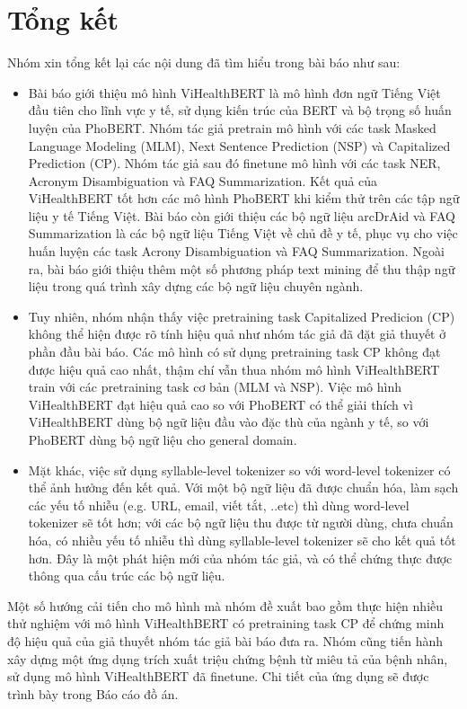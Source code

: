 \section{Tổng kết}
Nhóm xin tổng kết lại các nội dung đã tìm hiểu trong bài báo như sau:
\begin{itemize}
\item Bài báo giới thiệu mô hình ViHealthBERT là mô hình đơn ngữ Tiếng Việt đầu tiên cho lĩnh vực y tế, sử dụng kiến trúc của BERT và bộ trọng số huấn luyện của PhoBERT. Nhóm tác giả pretrain mô hình với các task Masked Language Modeling (MLM), Next Sentence Prediction (NSP) và Capitalized Prediction (CP). Nhóm tác giả sau đó finetune mô hình với các task NER, Acronym Disambiguation và FAQ Summarization. Kết quả của ViHealthBERT tốt hơn các mô hình PhoBERT khi kiểm thử trên các tập ngữ liệu y tế Tiếng Việt. Bài báo còn giới thiệu các bộ ngữ liệu arcDrAid và FAQ Summarization là các bộ ngữ liệu Tiếng Việt về chủ đề y tế, phục vụ cho việc huấn luyện các task Acrony Disambiguation và FAQ Summarization. Ngoài ra, bài báo giới thiệu thêm một số phương pháp text mining để thu thập ngữ liệu trong quá trình xây dựng các bộ ngữ liệu chuyên ngành.

\item Tuy nhiên, nhóm nhận thấy việc pretraining task Capitalized Predicion (CP) không thể hiện được rõ tính hiệu quả như nhóm tác giả đã đặt giả thuyết ở phần đầu bài báo. Các mô hình có sử dụng pretraining task CP không đạt được hiệu quả cao nhất, thậm chí vẫn thua nhóm mô hình ViHealthBERT train với các pretraining task cơ bản (MLM và NSP). Việc mô hình ViHealthBERT đạt hiệu quả cao so với PhoBERT có thể giải thích vì ViHealthBERT dùng bộ ngữ liệu đầu vào đặc thù của ngành y tế, so với PhoBERT dùng bộ ngữ liệu cho general domain.

\item  Mặt khác, việc sử dụng syllable-level tokenizer so với word-level tokenizer có thể ảnh hưởng đến kết quả. Với một bộ ngữ liệu đã được chuẩn hóa, làm sạch các yếu tố nhiễu (e.g. URL, email, viết tắt, ..etc) thì dùng word-level tokenizer sẽ tốt hơn; với các bộ ngữ liệu thu được từ người dùng, chưa chuẩn hóa, có nhiều yếu tố nhiễu thì dùng syllable-level tokenizer sẽ cho kết quả tốt hơn. Đây là một phát hiện mới của nhóm tác giả, và có thể chứng thực được thông qua cấu trúc các bộ ngữ liệu.
\end{itemize}
Một số hướng cải tiến cho mô hình mà nhóm đề xuất bao gồm thực hiện nhiều thử nghiệm với mô hình ViHealthBERT có pretraining task CP để chứng minh độ hiệu quả của giả thuyết nhóm tác giả bài báo đưa ra. Nhóm cũng tiến hành xây dựng một ứng dụng trích xuất triệu chứng bệnh từ miêu tả của bệnh nhân, sử dụng mô hình ViHealthBERT đã finetune. Chi tiết của ứng dụng sẽ được trình bày trong Báo cáo đồ án.